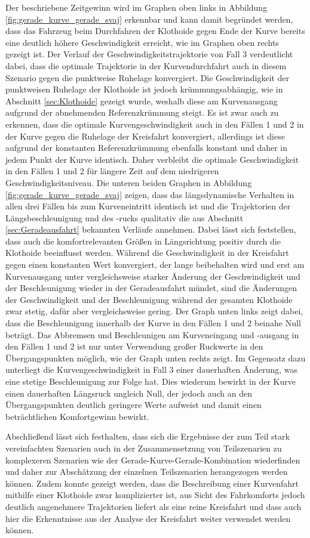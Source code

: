 Der beschriebene Zeitgewinn wird im Graphen oben links in Abbildung \ref{fig:gerade_kurve_gerade_svaj} erkennbar und kann damit begründet werden, dass das Fahrzeug beim Durchfahren der Klothoide gegen Ende der Kurve bereits eine deutlich höhere Geschwindigkeit erreicht, wie im Graphen oben rechts gezeigt ist. Der Verlauf der Geschwindigkeitstrajektorie von Fall 3 verdeutlicht dabei, dass die optimale Trajektorie in der Kurvendurchfahrt auch in diesem Szenario gegen die punktweise Ruhelage konvergiert. Die Geschwindigkeit der punktweisen Ruhelage der Klothoide ist jedoch krümmungsabhängig, wie in Abschnitt \ref{sec:Klothoide} gezeigt wurde, weshalb diese am Kurvenausgang aufgrund der abnehmenden Referenzkrümmung steigt. Es ist zwar auch zu erkennen, dass die optimale Kurvengeschwindigkeit auch in den Fällen 1 und 2 in der Kurve gegen die Ruhelage der Kreisfahrt konvergiert, allerdings ist diese aufgrund der konstanten Referenzkrümmung ebenfalls konstant und daher in jedem Punkt der Kurve identisch. Daher verbleibt die optimale Geschwindigkeit in den Fällen 1 und 2 für längere Zeit auf dem niedrigeren Geschwindigkeitsniveau. Die unteren beiden Graphen in Abbildung \ref{fig:gerade_kurve_gerade_svaj} zeigen, dass das längsdynamische Verhalten in allen drei Fällen bis zum Kurveneintritt identisch ist und die Trajektorien der Längsbeschleunigung und des -rucks qualitativ die aus Abschnitt \ref{sec:Geradeausfahrt} bekannten Verläufe annehmen. Dabei lässt sich feststellen, dass auch die komfortrelevanten Größen in Längsrichtung positiv durch die Klothoide beeinflusst werden. Während die Geschwindigkeit in der Kreisfahrt gegen einen konstanten Wert konvergiert, der lange beibehalten wird und erst am Kurvenausgang unter vergleichsweise starker Änderung der Geschwindigkeit und der Beschleunigung wieder in der Geradeausfahrt mündet, sind die Änderungen der Geschwindigkeit und der Beschleunigung während der gesamten Klothoide zwar stetig, dafür aber vergleichsweise gering. Der Graph unten links zeigt dabei, dass die Beschleunigung innerhalb der Kurve in den Fällen 1 und 2 beinahe Null beträgt. Das Abbremsen und Beschleunigen am Kurveneingang und -ausgang in den Fällen 1 und 2 ist nur unter Verwendung großer Ruckwerte in den Übergangspunkten möglich, wie der Graph unten rechts zeigt. Im Gegensatz dazu unterliegt die Kurvengeschwindigkeit in Fall 3 einer dauerhaften Änderung, was eine stetige Beschleunigung zur Folge hat. Dies wiederum bewirkt in der Kurve einen dauerhaften Längsruck ungleich Null, der jedoch auch an den Übergangspunkten deutlich geringere Werte aufweist und damit einen beträchtlichen Komfortgewinn bewirkt. 

Abschließend lässt sich festhalten, dass sich die Ergebnisse der zum Teil stark vereinfachten Szenarien auch in der Zusammensetzung von Teilszenarien zu komplexeren Szenarien wie der Gerade-Kurve-Gerade-Kombination wiederfinden und daher zur Abschätzung der einzelnen Teilszenarien herangezogen werden können. Zudem konnte gezeigt werden, dass die Beschreibung einer Kurvenfahrt mithilfe einer Klothoide zwar komplizierter ist, aus Sicht des Fahrkomforts jedoch deutlich angenehmere Trajektorien liefert als eine reine Kreisfahrt und dass auch hier die Erkenntnisse aus der Analyse der Kreisfahrt weiter verwendet werden können. 